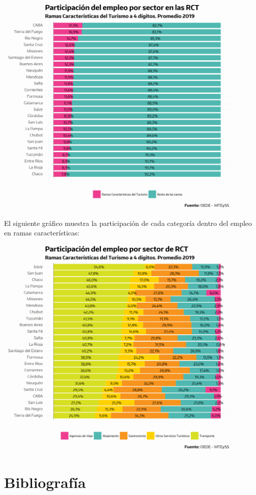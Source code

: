 \documentclass[
  openany]{book}
\begin{document}
\begin{center}\includegraphics[width=1\linewidth]{imagenes/empleo.prov.part} \end{center}

El siguiente gráfico muestra la participación de cada categoría dentro del empleo en ramas características:

\begin{center}\includegraphics[width=1\linewidth]{imagenes/empleo.prov.part.agrup} \end{center}

\hypertarget{bibliografuxeda}{%
\chapter*{\texorpdfstring{\textbf{Bibliografía}}{Bibliografía}}\label{bibliografuxeda}}
\end{document}
